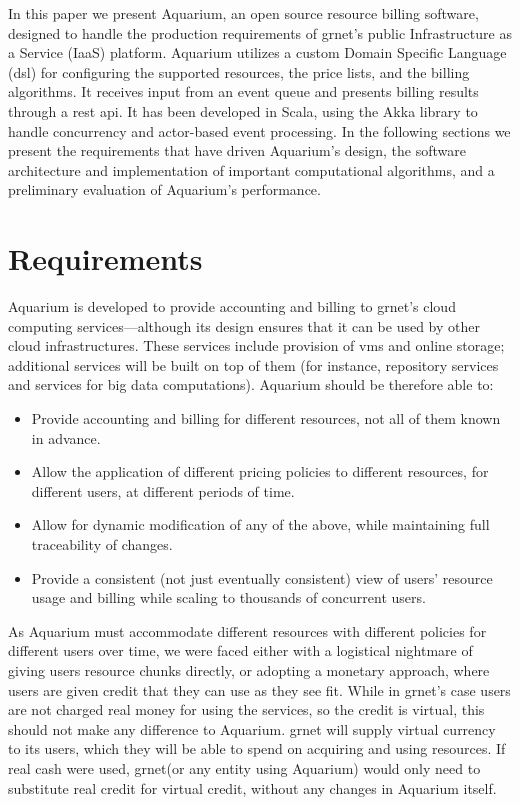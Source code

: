 \documentclass[letterpaper,twocolumn,10pt]{article}
\newcommand{\grnet}{{\sc grnet}\xspace}
\begin{document}
In this paper we present Aquarium, an open source resource billing software,
designed to handle the production  requirements of \grnet's public
Infrastructure as a Service (IaaS) platform. Aquarium utilizes a custom Domain
Specific Language ({\sc dsl}) for configuring the supported resources, the
price lists, and the billing algorithms. It receives input from an event queue
and presents billing results through a {\sc rest api}. It has been developed
in Scala, using the Akka library to handle concurrency and actor-based
event processing. In the following sections we present the requirements
that have driven Aquarium's design, the software architecture and
implementation of important computational algorithms, and a preliminary
evaluation of Aquarium's performance. 

\section{Requirements}

Aquarium is developed to provide accounting and billing to \grnet's
cloud computing services---although its design ensures that it can be
used by other cloud infrastructures. These services include provision
of {\sc vm}s and online storage; additional services will be built on
top of them (for instance, repository services and services for big
data computations). Aquarium should be therefore able to:

\begin{itemize}

\item Provide accounting and billing for different resources, not all
  of them known in advance.

\item Allow the application of different pricing policies to different
  resources, for different users, at different periods of time.

\item Allow for dynamic modification of any of the above, while
  maintaining full traceability of changes.

\item Provide a consistent (not just eventually consistent) view of
  users' resource usage and billing while scaling to thousands of
  concurrent users.

\end{itemize}

As Aquarium must accommodate different resources with different
policies for different users over time, we were faced either with a
logistical nightmare of giving users resource chunks directly, or
adopting a monetary approach, where users are given credit that they
can use as they see fit. While in \grnet's case users are not charged
real money for using the services, so the credit is virtual, this
should not make any difference to Aquarium. \grnet will supply virtual
currency to its users, which they will be able to spend on acquiring
and using resources. If real cash were used, \grnet (or any entity
using Aquarium) would only need to substitute real credit for virtual
credit, without any changes in Aquarium itself.
\end{document}
